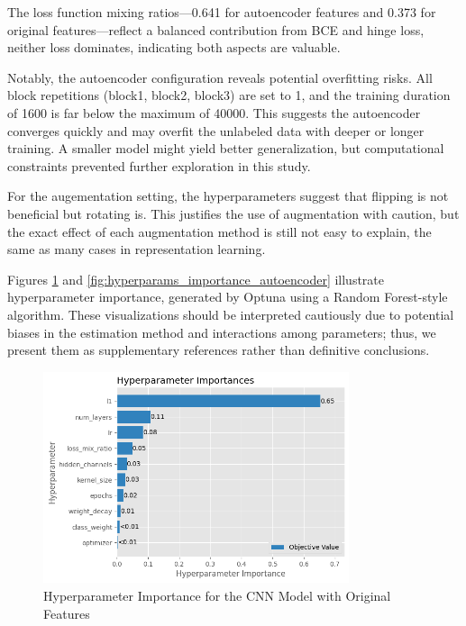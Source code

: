 \documentclass[10pt,letterpaper]{article}
\begin{document}
The loss function mixing ratios—0.641 for autoencoder features and 0.373 for original features—reflect a balanced contribution from BCE and hinge loss, neither loss dominates, indicating both aspects are valuable.

Notably, the autoencoder configuration reveals potential overfitting risks. All block repetitions (block1, block2, block3) are set to 1, and the training duration of 1600 is far below the maximum of 40000. This suggests the autoencoder converges quickly and may overfit the unlabeled data with deeper or longer training. A smaller model might yield better generalization, but computational constraints prevented further exploration in this study.

For the augementation setting, the hyperparameters suggest that flipping is not beneficial but rotating is. This justifies the use of augmentation with caution, but the exact effect of each augmentation method is still not easy to explain, the same as many cases in representation learning.

Figures \ref{fig:hyperparams_importance_original} and \ref{fig:hyperparams_importance_autoencoder} illustrate hyperparameter importance, generated by Optuna using a Random Forest-style algorithm. These visualizations should be interpreted cautiously due to potential biases in the estimation method and interactions among parameters; thus, we present them as supplementary references rather than definitive conclusions.

\begin{figure}[ht]
    \centering
    \includegraphics[width=0.8\textwidth]{figs/feature importance original.png}
    \caption{Hyperparameter Importance for the CNN Model with Original Features}
    \label{fig:hyperparams_importance_original}
\end{figure}
\end{document}
